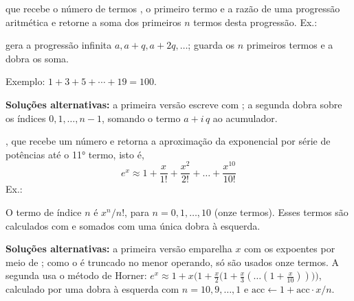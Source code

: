 {{\begin{Qlist}
\begin{solution}
        \end{solution}

        \item[(d)]  que recebe o
            número de termos , o primeiro termo  e a razão
             de uma progressão aritmética e retorne a soma dos primeiros $n$
            termos desta progressão. Ex.:


        \begin{solution}
         gera a progressão infinita $a, a+q, a+2q, \ldots$;
         guarda os $n$ primeiros termos e a dobra 
        os soma.


        Exemplo: $1+3+5+\cdots+19=100$.


        \textbf{Soluções alternativas:} a primeira versão escreve  com ; a segunda dobra sobre os índices $0, 1, \ldots, n-1$, somando o termo $a + i\,q$ ao acumulador.

        \end{solution}

        \item[(e)] , que recebe um número 
            e retorna a aproximação da exponencial por série de potências até o 11° termo, isto
            é,
        \[
            e^x \approx 1 + \frac{x}{1!} + \frac{x^2}{2!} + \ldots + \frac{x^{10}}{10!}
        \]
        Ex.:

        \begin{solution}
        O termo de índice $n$ é $x^n/n!$, para $n=0,1,\ldots,10$ (onze termos). Esses termos são
        calculados com  e somados com uma única dobra à esquerda.


        \textbf{Soluções alternativas:} a primeira versão emparelha $x$ com os expoentes por meio de ; como o  é truncado no menor operando, só são usados onze termos. A segunda usa o método de Horner: $e^x\approx 1 + x\bigl(1 + \tfrac{x}{2}\bigl(1 + \tfrac{x}{3}(\ldots(1 + \tfrac{x}{10}))\bigr)\bigr)$, calculado por uma dobra à esquerda com $n=10,9,\ldots,1$ e $\text{acc}\leftarrow 1 + \text{acc}\cdot x/n$.

        \end{solution}
    \end{Qlist}
} }

